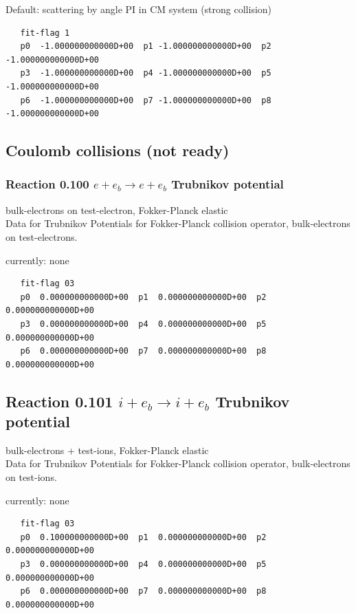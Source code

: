 \documentclass[12pt,dvipdfmx]{article}
\begin{document}
Default: scattering by angle PI in CM system (strong collision)

\begin{small}\begin{verbatim}
   fit-flag 1
   p0  -1.000000000000D+00  p1 -1.000000000000D+00  p2 -1.000000000000D+00
   p3  -1.000000000000D+00  p4 -1.000000000000D+00  p5 -1.000000000000D+00
   p6  -1.000000000000D+00  p7 -1.000000000000D+00  p8 -1.000000000000D+00
\end{verbatim}\end{small}

\newpage

\subsection{Coulomb collisions (not ready)}

\subsubsection{
Reaction 0.100 $ e + e_b \rightarrow e + e_b$ Trubnikov potential}
bulk-electrons on test-electron, Fokker-Planck elastic \\
Data for Trubnikov Potentials for Fokker-Planck collision
operator, bulk-electrons on test-electrons.

currently: none


\begin{small}\begin{verbatim}
   fit-flag 03
   p0  0.000000000000D+00  p1  0.000000000000D+00  p2  0.000000000000D+00
   p3  0.000000000000D+00  p4  0.000000000000D+00  p5  0.000000000000D+00
   p6  0.000000000000D+00  p7  0.000000000000D+00  p8  0.000000000000D+00
\end{verbatim}\end{small}

\subsection{
Reaction 0.101  $ i + e_b \rightarrow i + e_b$ Trubnikov potential}
bulk-electrons + test-ions, Fokker-Planck elastic \\
Data for Trubnikov Potentials for Fokker-Planck collision
operator, bulk-electrons on test-ions.

currently: none


\begin{small}\begin{verbatim}
   fit-flag 03
   p0  0.100000000000D+00  p1  0.000000000000D+00  p2  0.000000000000D+00
   p3  0.000000000000D+00  p4  0.000000000000D+00  p5  0.000000000000D+00
   p6  0.000000000000D+00  p7  0.000000000000D+00  p8  0.000000000000D+00
\end{verbatim}\end{small}
\end{document}
